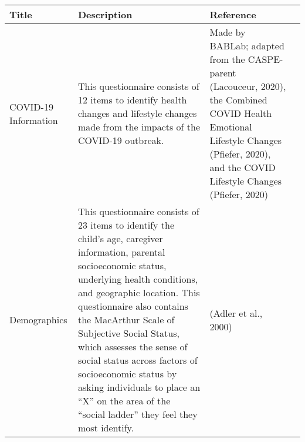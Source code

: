 \documentclass[]{book}
\begin{document}
\begin{longtable}[]{@{}llll@{}}
\toprule
\begin{minipage}[b]{0.22\columnwidth}\raggedright
Title\strut
\end{minipage} & \begin{minipage}[b]{0.27\columnwidth}\raggedright
Description\strut
\end{minipage} & \begin{minipage}[b]{0.22\columnwidth}\raggedright
Reference\strut
\end{minipage} & \begin{minipage}[b]{0.18\columnwidth}\raggedright
\strut
\end{minipage}\tabularnewline
\midrule
\endhead
\begin{minipage}[t]{0.22\columnwidth}\raggedright
COVID-19 Information\strut
\end{minipage} & \begin{minipage}[t]{0.27\columnwidth}\raggedright
This questionnaire consists of 12 items to identify health changes and lifestyle changes made from the impacts of the COVID-19 outbreak.\strut
\end{minipage} & \begin{minipage}[t]{0.22\columnwidth}\raggedright
Made by BABLab; adapted from the CASPE- parent (Lacouceur, 2020), the Combined COVID Health Emotional Lifestyle Changes (Pfiefer, 2020), and the COVID Lifestyle Changes (Pfiefer, 2020)\strut
\end{minipage} & \begin{minipage}[t]{0.18\columnwidth}\raggedright
\strut
\end{minipage}\tabularnewline
\begin{minipage}[t]{0.22\columnwidth}\raggedright
Demographics\strut
\end{minipage} & \begin{minipage}[t]{0.27\columnwidth}\raggedright
This questionnaire consists of 23 items to identify the child's age, caregiver information, parental socioeconomic status, underlying health conditions, and geographic location. This questionnaire also contains the MacArthur Scale of Subjective Social Status, which assesses the sense of social status across factors of socioeconomic status by asking individuals to place an ``X'' on the area of the ``social ladder'' they feel they most identify.\strut
\end{minipage} & \begin{minipage}[t]{0.22\columnwidth}\raggedright
(Adler et al., 2000)\strut
\end{minipage} & \begin{minipage}[t]{0.18\columnwidth}\raggedright
\strut
\end{minipage}\tabularnewline
\bottomrule
\end{longtable}
\end{document}

